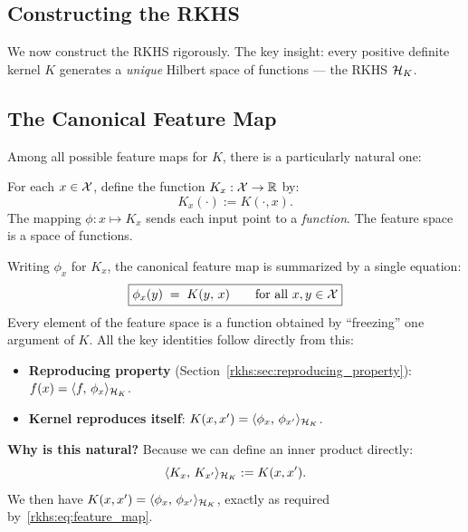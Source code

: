 \begin{notechapter}
\section{Constructing the RKHS}
\label{rkhs:sec:rkhs_construction}

We now construct the RKHS rigorously. The key insight: every positive
definite kernel $K$ generates a \emph{unique} Hilbert space of functions
--- the RKHS $\mathcal{H}_K$.

\subsection{The Canonical Feature Map}
\label{rkhs:subsec:canonical_feature_map}

Among all possible feature maps for $K$, there is a particularly natural one:

\begin{definitionbox}
\begin{definition}
\label{rkhs:def:canonical_feature}
For each $x \in \mathcal{X}$, define the function
$K_x: \mathcal{X} \to \mathbb{R}$ by:
\[
K_x(\cdot) := K(\cdot, x).
\]
The mapping $\phi: x \mapsto K_x$ sends each input
point to a \emph{function}. The feature space is a
space of functions.
\end{definition}
\end{definitionbox}

Writing $\phi_x$ for $K_x$, the canonical feature map
is summarized by a single equation:
\begin{equation}
\label{rkhs:eq:canonical_feature}
\boxed{\phi_x(y) \;=\; K(y,\, x)
  \qquad \text{for all } x, y \in \mathcal{X}}
\end{equation}
Every element of the feature space is a function
obtained by ``freezing'' one argument of $K$. All
the key identities follow directly from this:
\begin{itemize}
  \item \textbf{Reproducing property}
    (Section~\ref{rkhs:sec:reproducing_property}):
    $f(x) = \langle f,\, \phi_x \rangle_{\mathcal{H}_K}$.
  \item \textbf{Kernel reproduces itself}:
    $K(x,x') = \langle \phi_x,\, \phi_{x'} \rangle_{\mathcal{H}_K}$.
\end{itemize}

\textbf{Why is this natural?} Because we can define an
inner product directly:
\[
\langle K_x,\, K_{x'} \rangle_{\mathcal{H}_K} := K(x, x').
\]
We then have
$K(x,x') = \langle \phi_x,\, \phi_{x'} \rangle_{\mathcal{H}_K}$, exactly
as required by~\eqref{rkhs:eq:feature_map}.


\end{notechapter}
